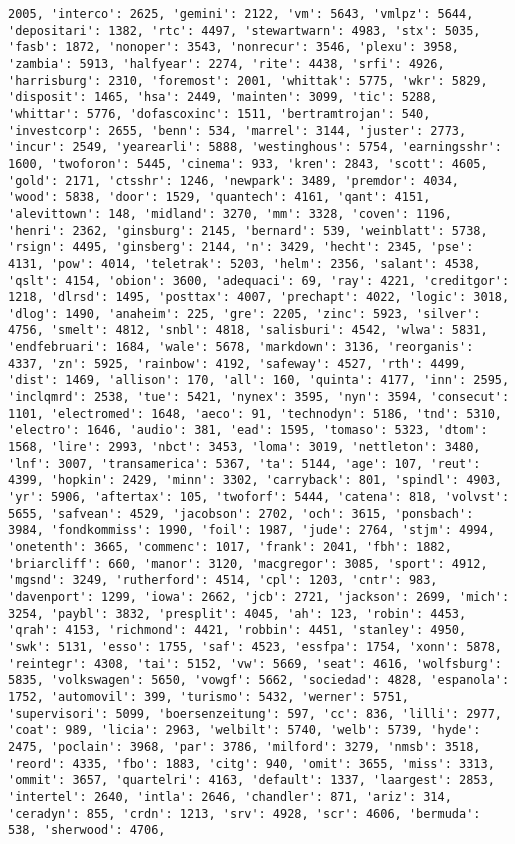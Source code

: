 \documentclass[11pt]{article}
\begin{document}
\begin{Verbatim}[commandchars=\\\{\}]
2005, 'interco': 2625, 'gemini': 2122, 'vm': 5643, 'vmlpz': 5644, 'depositari': 1382, 'rtc': 4497, 'stewartwarn': 4983, 'stx': 5035, 'fasb': 1872, 'nonoper': 3543, 'nonrecur': 3546, 'plexu': 3958, 'zambia': 5913, 'halfyear': 2274, 'rite': 4438, 'srfi': 4926, 'harrisburg': 2310, 'foremost': 2001, 'whittak': 5775, 'wkr': 5829, 'disposit': 1465, 'hsa': 2449, 'mainten': 3099, 'tic': 5288, 'whittar': 5776, 'dofascoxinc': 1511, 'bertramtrojan': 540, 'investcorp': 2655, 'benn': 534, 'marrel': 3144, 'juster': 2773, 'incur': 2549, 'yearearli': 5888, 'westinghous': 5754, 'earningsshr': 1600, 'twoforon': 5445, 'cinema': 933, 'kren': 2843, 'scott': 4605, 'gold': 2171, 'ctsshr': 1246, 'newpark': 3489, 'premdor': 4034, 'wood': 5838, 'door': 1529, 'quantech': 4161, 'qant': 4151, 'alevittown': 148, 'midland': 3270, 'mm': 3328, 'coven': 1196, 'henri': 2362, 'ginsburg': 2145, 'bernard': 539, 'weinblatt': 5738, 'rsign': 4495, 'ginsberg': 2144, 'n': 3429, 'hecht': 2345, 'pse': 4131, 'pow': 4014, 'teletrak': 5203, 'helm': 2356, 'salant': 4538, 'qslt': 4154, 'obion': 3600, 'adequaci': 69, 'ray': 4221, 'creditgor': 1218, 'dlrsd': 1495, 'posttax': 4007, 'prechapt': 4022, 'logic': 3018, 'dlog': 1490, 'anaheim': 225, 'gre': 2205, 'zinc': 5923, 'silver': 4756, 'smelt': 4812, 'snbl': 4818, 'salisburi': 4542, 'wlwa': 5831, 'endfebruari': 1684, 'wale': 5678, 'markdown': 3136, 'reorganis': 4337, 'zn': 5925, 'rainbow': 4192, 'safeway': 4527, 'rth': 4499, 'dist': 1469, 'allison': 170, 'all': 160, 'quinta': 4177, 'inn': 2595, 'inclqmrd': 2538, 'tue': 5421, 'nynex': 3595, 'nyn': 3594, 'consecut': 1101, 'electromed': 1648, 'aeco': 91, 'technodyn': 5186, 'tnd': 5310, 'electro': 1646, 'audio': 381, 'ead': 1595, 'tomaso': 5323, 'dtom': 1568, 'lire': 2993, 'nbct': 3453, 'loma': 3019, 'nettleton': 3480, 'lnf': 3007, 'transamerica': 5367, 'ta': 5144, 'age': 107, 'reut': 4399, 'hopkin': 2429, 'minn': 3302, 'carryback': 801, 'spindl': 4903, 'yr': 5906, 'aftertax': 105, 'twoforf': 5444, 'catena': 818, 'volvst': 5655, 'safvean': 4529, 'jacobson': 2702, 'och': 3615, 'ponsbach': 3984, 'fondkommiss': 1990, 'foil': 1987, 'jude': 2764, 'stjm': 4994, 'onetenth': 3665, 'commenc': 1017, 'frank': 2041, 'fbh': 1882, 'briarcliff': 660, 'manor': 3120, 'macgregor': 3085, 'sport': 4912, 'mgsnd': 3249, 'rutherford': 4514, 'cpl': 1203, 'cntr': 983, 'davenport': 1299, 'iowa': 2662, 'jcb': 2721, 'jackson': 2699, 'mich': 3254, 'paybl': 3832, 'presplit': 4045, 'ah': 123, 'robin': 4453, 'qrah': 4153, 'richmond': 4421, 'robbin': 4451, 'stanley': 4950, 'swk': 5131, 'esso': 1755, 'saf': 4523, 'essfpa': 1754, 'xonn': 5878, 'reintegr': 4308, 'tai': 5152, 'vw': 5669, 'seat': 4616, 'wolfsburg': 5835, 'volkswagen': 5650, 'vowgf': 5662, 'sociedad': 4828, 'espanola': 1752, 'automovil': 399, 'turismo': 5432, 'werner': 5751, 'supervisori': 5099, 'boersenzeitung': 597, 'cc': 836, 'lilli': 2977, 'coat': 989, 'licia': 2963, 'welbilt': 5740, 'welb': 5739, 'hyde': 2475, 'poclain': 3968, 'par': 3786, 'milford': 3279, 'nmsb': 3518, 'reord': 4335, 'fbo': 1883, 'citg': 940, 'omit': 3655, 'miss': 3313, 'ommit': 3657, 'quartelri': 4163, 'default': 1337, 'laargest': 2853, 'intertel': 2640, 'intla': 2646, 'chandler': 871, 'ariz': 314, 'ceradyn': 855, 'crdn': 1213, 'srv': 4928, 'scr': 4606, 'bermuda': 538, 'sherwood': 4706, 
\end{Verbatim}
\end{document}
